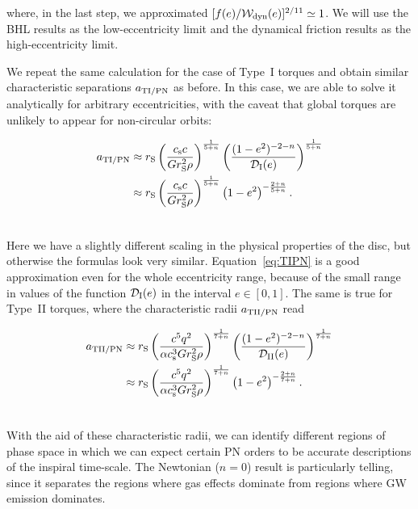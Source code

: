 \documentclass[usenatbib]{mnras}
\begin{document}
\noindent where, in the last step, we approximated $[f(e)/ \mathcal{W}_{\rm{dyn}}(e)]^{2/11} \simeq 1$. We will use the BHL results as the low-eccentricity limit and the dynamical friction results as the high-eccentricity limit.

We repeat the same calculation for the case of Type~I torques and obtain similar characteristic separations $a_{\rm{TI/PN}}$ as before. In this case, we are able to solve it analytically for arbitrary eccentricities, with the caveat that global torques are unlikely to appear for non-circular orbits:

\begin{align}
  a_{\rm{TI/PN}}  &\approx  r_{\rm S} \left(\frac{c_{\rm s} c }{ G  r_{\rm S}^2 \rho} \right)^{\frac{1}{5+n}} \left(\frac{(1-e^2)^{-2 -n}}{\mathcal{D}_{\rm I}(e)} \right) ^{\frac{1}{5+n}} \\
  &\approx  r_{\rm S} \left(\frac{c_{\rm s} c }{ G  r_{\rm S}^2 \rho} \right)^{\frac{1}{5+n}} \left(1-e^2\right) ^{-\frac{2 + n}{5+n}}.\label{eq:TIPN}\\ \nonumber
\end{align}

Here we have a slightly different scaling in the physical properties of the disc, but otherwise the formulas look very similar. Equation~\eqref{eq:TIPN} is a good approximation even for the whole eccentricity range, because of the small range in values of the function $\mathcal{D}_{\rm I}(e)$ in the interval $e \in [0,1]$. The same is true for Type~II torques, where the characteristic radii $a_{\rm{TII/PN}}$ read

\begin{align}
  a_{\rm{TII/PN}}  &\approx  r_{\rm S} \left(\frac{ c^5 q ^2 }{\alpha c_{\rm s}^3 G  r_{\rm S}^2 \rho} \right)^{\frac{1}{7+n}} \left(\frac{(1-e^2)^{-2 -n}}{\mathcal{D}_{\rm II}(e)} \right) ^{\frac{1}{7+n}} \\
  &\approx  r_{\rm S}\left(\frac{ c^5 q^2}{\alpha c_{\rm s}^3 G  r_{\rm S}^2 \rho} \right)^{\frac{1}{7+n}} \left(1-e^2\right) ^{-\frac{2 + n}{7+n}}. \label{eq:r11}\\ \nonumber
\end{align}

With the aid of these characteristic radii, we can identify different regions of phase space in which we can expect certain PN orders to be accurate descriptions of the inspiral time-scale. The Newtonian ($n=0$) result is particularly telling, since it separates the regions where gas effects dominate from regions where GW emission dominates.
\end{document}
